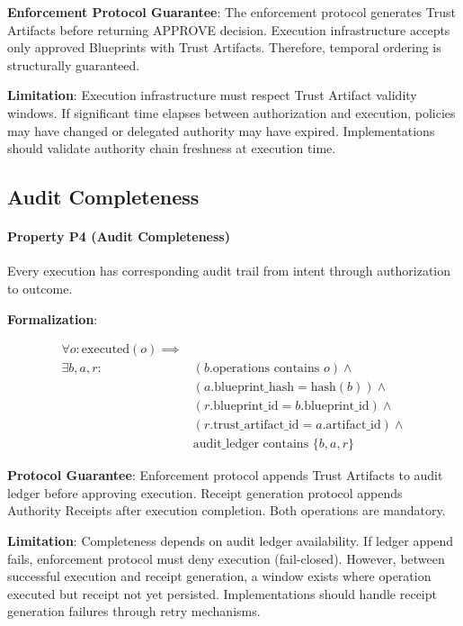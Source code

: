 \documentclass[11pt,letterpaper]{article}
\begin{document}
\textbf{Enforcement Protocol Guarantee}: The enforcement protocol generates Trust Artifacts before returning APPROVE decision. Execution infrastructure accepts only approved Blueprints with Trust Artifacts. Therefore, temporal ordering is structurally guaranteed.

\textbf{Limitation}: Execution infrastructure must respect Trust Artifact validity windows. If significant time elapses between authorization and execution, policies may have changed or delegated authority may have expired. Implementations should validate authority chain freshness at execution time.

\subsection{Audit Completeness}

\paragraph{Property P4 (Audit Completeness)} Every execution has corresponding audit trail from intent through authorization to outcome.

\textbf{Formalization}:

\begin{equation}
\begin{split}
\forall o: \text{executed}(o) \implies & \\
\exists b, a, r: & (b.\text{operations contains } o) \land \\
& (a.\text{blueprint\_hash} = \text{hash}(b)) \land \\
& (r.\text{blueprint\_id} = b.\text{blueprint\_id}) \land \\
& (r.\text{trust\_artifact\_id} = a.\text{artifact\_id}) \land \\
& \text{audit\_ledger contains } \{b, a, r\}
\end{split}
\end{equation}

\textbf{Protocol Guarantee}: Enforcement protocol appends Trust Artifacts to audit ledger before approving execution. Receipt generation protocol appends Authority Receipts after execution completion. Both operations are mandatory.

\textbf{Limitation}: Completeness depends on audit ledger availability. If ledger append fails, enforcement protocol must deny execution (fail-closed). However, between successful execution and receipt generation, a window exists where operation executed but receipt not yet persisted. Implementations should handle receipt generation failures through retry mechanisms.
\end{document}
